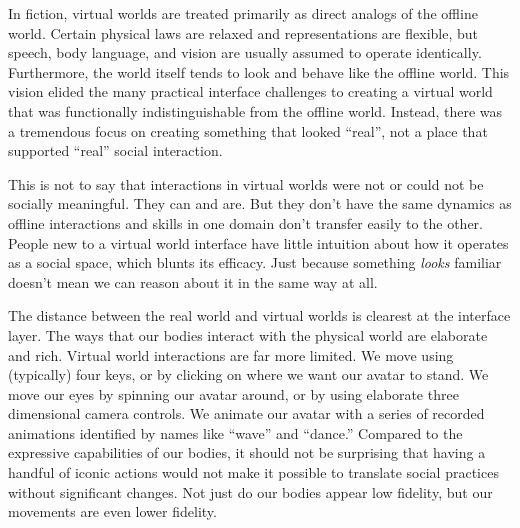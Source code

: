 In fiction, virtual worlds are treated primarily as direct analogs of the offline world. Certain physical laws are relaxed and representations are flexible, but speech, body language, and vision are usually assumed to operate identically. Furthermore, the world itself tends to look and behave like the offline world.  This vision elided the many practical interface challenges to creating a virtual world that was functionally indistinguishable from the offline world. Instead, there was a tremendous focus on creating something that looked ``real'', not a place that supported ``real'' social interaction. 

This is not to say that interactions in virtual worlds were not or could not be socially meaningful. They can and are. But they don't have the same dynamics as offline interactions and skills in one domain don't transfer easily to the other. People new to a virtual world interface have little intuition about how it operates as a social space, which blunts its efficacy. Just because something \emph{looks} familiar doesn't mean we can reason about it in the same way at all.

The distance between the real world and virtual worlds is clearest at the interface layer. The ways that our bodies interact with the physical world are  elaborate and rich. Virtual world interactions are far more limited. We move using (typically) four keys, or by clicking on where we want our avatar to stand. We move our eyes by spinning our avatar around, or by using elaborate three dimensional camera controls. We animate our avatar with a series of recorded animations identified by names like ``wave'' and ``dance.'' Compared to the expressive capabilities of our bodies, it should not be surprising that having a handful of iconic actions would not make it possible to translate social practices without significant changes. Not just do our bodies appear low fidelity, but our movements are even lower fidelity. 

